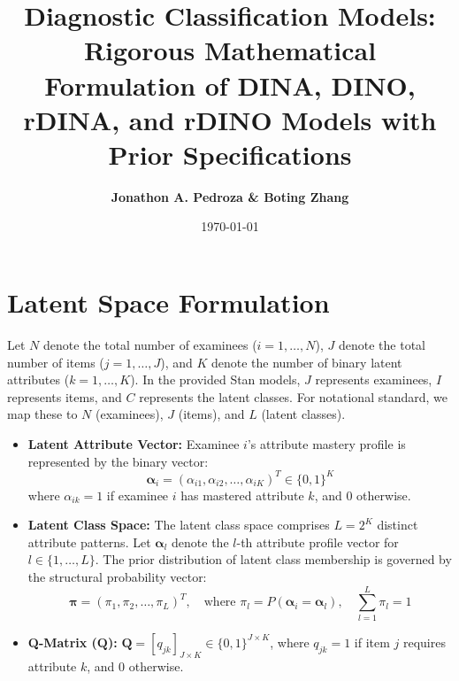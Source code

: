 \documentclass[11pt,a4paper]{article}
\title{\textbf{Diagnostic Classification Models: Rigorous Mathematical 
Formulation of DINA, DINO, rDINA, and rDINO Models 
with Prior Specifications}}
\author{\textbf{Jonathon A. Pedroza \& Boting Zhang}}
\date{\today}
\begin{document}
\maketitle

\tableofcontents
\newpage

\section{Latent Space Formulation}

Let $N$ denote the total number of examinees ($i = 1, \dots, N$), 
$J$ denote the total number of items ($j = 1, \dots, J$), 
and $K$ denote the number of binary latent attributes ($k = 1, \dots, K$). 
In the provided Stan models, $J$ represents examinees, 
$I$ represents items, and $C$ represents the latent classes. 
For notational standard, we map these to $N$ (examinees), 
$J$ (items), and $L$ (latent classes).

\begin{itemize}
    \item \textbf{Latent Attribute Vector:} 
    Examinee $i$'s attribute mastery profile is represented by the binary vector:
    \begin{equation}
        \boldsymbol{\alpha}_i = (\alpha_{i1}, \alpha_{i2}, \dots, \alpha_{iK})^T \in \{0, 1\}^K
    \end{equation}
    where $\alpha_{ik} = 1$ if examinee $i$ has mastered attribute $k$, 
    and $0$ otherwise.

    \item \textbf{Latent Class Space:} 
    The latent class space comprises $L = 2^K$ distinct attribute patterns. 
    Let $\boldsymbol{\alpha}_l$ denote the $l$-th attribute profile vector 
    for $l \in \{1, \dots, L\}$. 
    The prior distribution of latent class membership is governed 
    by the structural probability vector:
    \begin{equation}
        \boldsymbol{\pi} = (\pi_1, \pi_2, \dots, \pi_L)^T, 
        \quad \text{where } \pi_l = P(\boldsymbol{\alpha}_i = \boldsymbol{\alpha}_l), 
        \quad \sum_{l=1}^L \pi_l = 1
    \end{equation}

    \item \textbf{Q-Matrix ($\mathbf{Q}$):} 
    $\mathbf{Q} = [q_{jk}]_{J \times K} \in \{0, 1\}^{J \times K}$, 
    where $q_{jk} = 1$ if item $j$ requires attribute $k$, 
    and $0$ otherwise.
\end{itemize}
\end{document}
